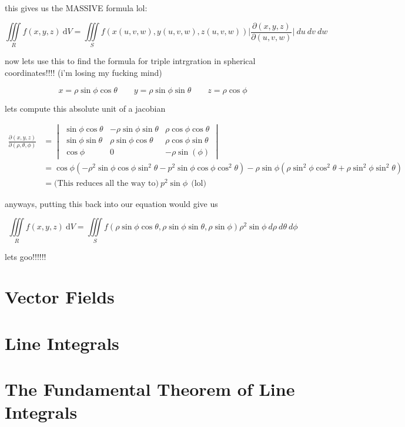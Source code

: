 \documentclass{article}
\begin{document}
this gives us the MASSIVE formula lol:

$$\iiint\limits_{R} f(x,y,z) \ \mathrm{d}V = \iiint\limits_{S} f(x(u,v,w), y(u,v,w), z(u,v,w)) \bigg\rvert \frac{\partial(x,y,z)}{\partial(u,v,w)} \bigg\rvert \ du \ dv \ dw$$

now lets use this to find the formula for triple intrgration in spherical coordinates!!!! (i'm losing my fucking mind) 

$$x =  \rho \sin{\phi} \cos{\theta} \qquad y = \rho \sin{\phi} \sin{\theta} \qquad z = \rho \cos{\phi}$$

lets compute this absolute unit of a jacobian 

\begin{align*}
    \frac{\partial(x,y,z)}{\partial(\rho,\theta,\phi)} &= \begin{vmatrix}
    \sin{\phi}\cos{\theta}  & -\rho\sin{\phi}\sin{\theta}  & \rho \cos{\phi} \cos{\theta} \\[6pt]
    \sin{\phi}\sin{\theta}   & \rho \sin{\phi} \cos{\theta} & \rho \cos{\phi}\sin{\theta}  \\[6pt]
    \cos{\phi}  & 0 & - \rho \sin(\phi)    
    \end{vmatrix} \\ 
    & = \cos{\phi} (-\rho^2\sin{\phi}\cos{\phi}\sin^2{\theta} - p^2\sin{\phi}\cos{\phi}\cos^2{\theta}) - \rho\sin{\phi} (\rho \sin^2{\phi}\cos^2{\theta + \rho \sin^2{\phi} \sin^2{\theta}}) \\ 
    & = \text{(This reduces all the way to)}  \ p^2\sin{\phi}  \ \ \text{(lol)} 
\end{align*}

anyways, putting this back into our equation would give us

$$\iiint\limits_{R}f(x,y,z) \ \mathrm{d}V = \iiint\limits_{S} f(\rho\sin{\phi}\cos{\theta}, \rho\sin{\phi}\sin{\theta}, \rho\sin{\phi}) \rho^2 \sin{\phi} \ d\rho \ d\theta \ d\phi$$

lets goo!!!!!!



\newpage
\section{Vector Fields}

\newpage
\section{Line Integrals}

\newpage
\section{The Fundamental Theorem of Line Integrals}
\end{document}
